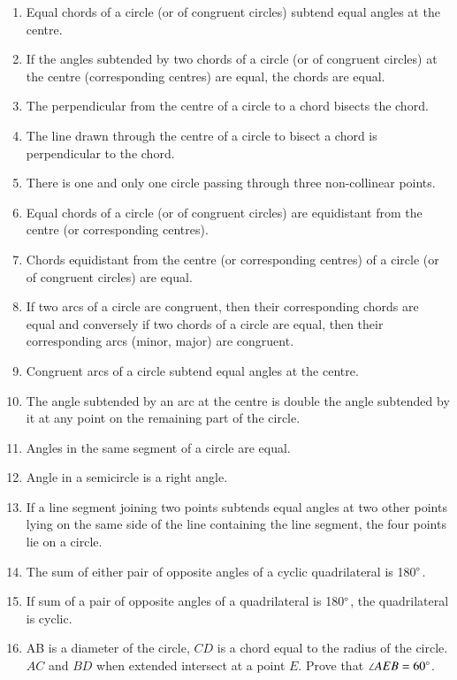 \renewcommand{\theequation}{\theenumi}
\begin{enumerate}[label=\arabic*.,ref=\thesubsection.\theenumi]
\item  Equal chords of a circle (or of congruent circles) subtend equal angles at the centre. 
\item  If the angles subtended by two chords of a circle (or of congruent circles) at the centre (corresponding centres) are equal, the chords are equal.
\item  The perpendicular from the centre of a circle to a chord bisects the chord. 
\item  The line drawn through the centre of a circle to bisect a chord is perpendicular to the chord.
\item  There is one and only one circle passing through three non-collinear points. 
\item  Equal chords of a circle (or of congruent circles) are equidistant from the centre (or corresponding centres).
\item Chords equidistant from the centre (or corresponding centres) of a circle (or of congruent circles) are equal.
\item  If two arcs of a circle are congruent, then their corresponding chords are equal and conversely if two chords of a circle are equal, then their corresponding arcs (minor, major) are congruent.
\item Congruent arcs of a circle subtend equal angles at the centre. 
\item  The angle subtended by an arc at the centre is double the angle subtended by it at any point on the remaining part of the circle.
\item Angles in the same segment of a circle are equal. \item  Angle in a semicircle is a right angle. 
\item  If a line segment joining two points subtends equal angles at two other points lying on the same side of the line containing the line segment, the four points lie on a circle. 
\item  The sum of either pair of opposite angles of a cyclic quadrilateral is 180$\degree$.
\item  If sum of a pair of opposite angles of a quadrilateral is 180$\degree$, the quadrilateral is cyclic.
%
\item AB is a diameter of the circle, $CD$ is a chord equal to the radius of the circle. $AC$ and $BD$ when extended intersect at a point $E$. Prove that $\angle AEB = 60\degree$.

\end{enumerate}
